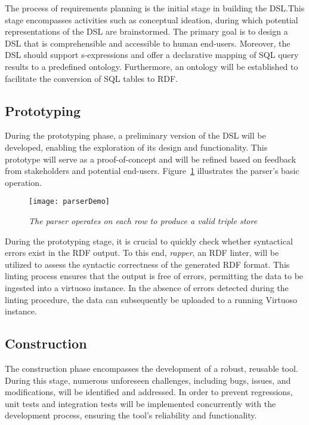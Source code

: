 The process of requirements planning is the initial stage in building the DSL.\@  This stage encompasses activities such as conceptual ideation, during which potential representations of the DSL are brainstormed.  The primary goal is to design a DSL that is comprehensible and accessible to human end-users.  Moreover, the DSL should support s-expressions and offer a declarative mapping of SQL query results to a predefined ontology.  Furthermore, an ontology will be established to facilitate the conversion of SQL tables to RDF\@.

\subsection{Prototyping}

During the prototyping phase, a preliminary version of the DSL will be developed, enabling the exploration of its design and functionality.  This prototype will serve as a proof-of-concept and will be refined based on feedback from stakeholders and potential end-users.  Figure~\ref{fig:parser-demo} illustrates the parser's basic operation.

\begin{figure}[H]
\centering
\texttt{[image: parserDemo]}
\caption{\textit{The parser operates on each row to produce a valid triple store}}\label{fig:parser-demo}
\centering
\end{figure}

During the prototyping stage, it is crucial to quickly check whether syntactical errors exist in the RDF output.  To this end, \textit{rapper}, an RDF linter, will be utilized to assess the syntactic correctness of the generated RDF format.  This linting process ensures that the output is free of errors, permitting the data to be ingested into a virtuoso instance.  In the absence of errors detected during the linting procedure, the data can subsequently be uploaded to a running Virtuoso instance.

\subsection{Construction}

The construction phase encompasses the development of a robust, reusable tool.  During this stage, numerous unforeseen challenges, including bugs, issues, and modifications, will be identified and addressed.  In order to prevent regressions, unit tests and integration tests will be implemented concurrently with the development process, ensuring the tool's reliability and functionality.

